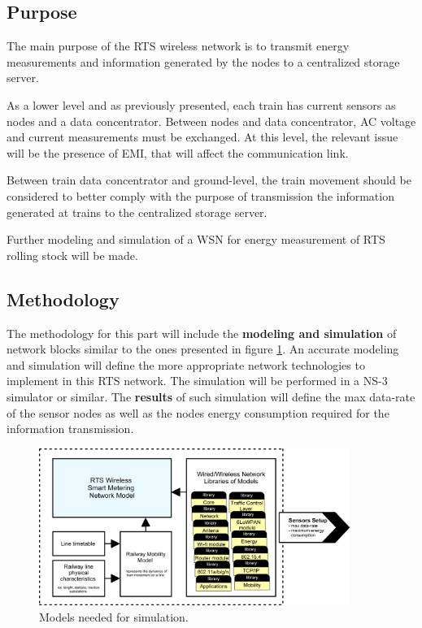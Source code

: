 \subsection{Purpose}

The main purpose of the RTS wireless network is to transmit energy measurements and information generated by the nodes to a centralized storage server. 

As a lower level and as previously presented, each train has current sensors as nodes and a data concentrator. Between nodes and data concentrator, AC voltage and current measurements must be exchanged.
At this level, the relevant issue will be the presence of EMI, that will affect the communication link.

Between train data concentrator and ground-level, the train movement should be considered to better comply with the purpose of transmission the information generated at trains to the centralized storage server. 

Further modeling and simulation of a WSN for energy measurement of RTS rolling stock will be made.



\subsection{Methodology}

The methodology for this part will include the \textbf{modeling and simulation} of network blocks similar to the ones presented in figure \ref{fig:4.methodWireless}. An accurate modeling and simulation will define the more appropriate network technologies to implement in this RTS network. 
The simulation will be performed in a NS-3 simulator or similar.
The \textbf{results} of such simulation will define the max data-rate of the sensor nodes as well as the nodes energy consumption required for the information transmission.

\begin{figure}[h!]
	\centering
	\includegraphics[width=0.9\textwidth,keepaspectratio]{figures/4.Method/methodWireless}
	\caption{Models needed for simulation.}
	\label{fig:4.methodWireless}
\end{figure}


